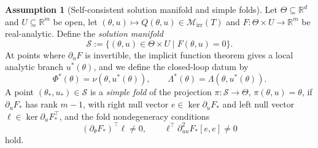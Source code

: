 \documentclass[11pt,reqno]{amsart}
\theoremstyle{plain}
\theoremstyle{definition}
\newtheorem{assumption}[theorem]{Assumption}
\theoremstyle{remark}
\newcommand{\R}{\mathbb{R}}
\begin{document}
\begin{assumption}[Self-consistent solution manifold and simple folds]\label{ass:self-consistent}
Let $\Theta\subseteq\R^{d}$ and $U\subseteq\R^{m}$ be open, let
$(\theta,u)\mapsto Q(\theta,u)\in\mathcal M_{\mathrm{irr}}(T)$ and
$F\colon\Theta\times U\to\R^{m}$ be real-analytic. Define the \emph{solution
manifold}
\[
\mathcal S:=\{(\theta,u)\in\Theta\times U\mid F(\theta,u)=0\}.
\]
At points where $\partial_uF$ is invertible, the implicit function theorem gives a
local analytic branch $u^{*}(\theta)$, and we define the closed-loop datum by
\[
\Phi^{*}(\theta)=\nu(\theta,u^{*}(\theta)),
\qquad
\Lambda^{*}(\theta)=\Lambda(\theta,u^{*}(\theta)).
\]
A point $(\theta_*,u_*)\in\mathcal S$ is a \emph{simple fold} of the projection
$\pi\colon\mathcal S\to\Theta$, $\pi(\theta,u)=\theta$, if $\partial_uF_*$ has rank
$m-1$, with right null vector $e\in\ker\partial_uF_*$ and left null vector
$\ell\in\ker\partial_uF_*^{\top}$, and the fold nondegeneracy conditions
\[
(\partial_\theta F_*)^{\top}\ell\neq0,
\qquad
\ell^{\top}\partial^2_{uu}F_*[e,e]\neq0
\]
hold.
\end{assumption}
\end{document}
